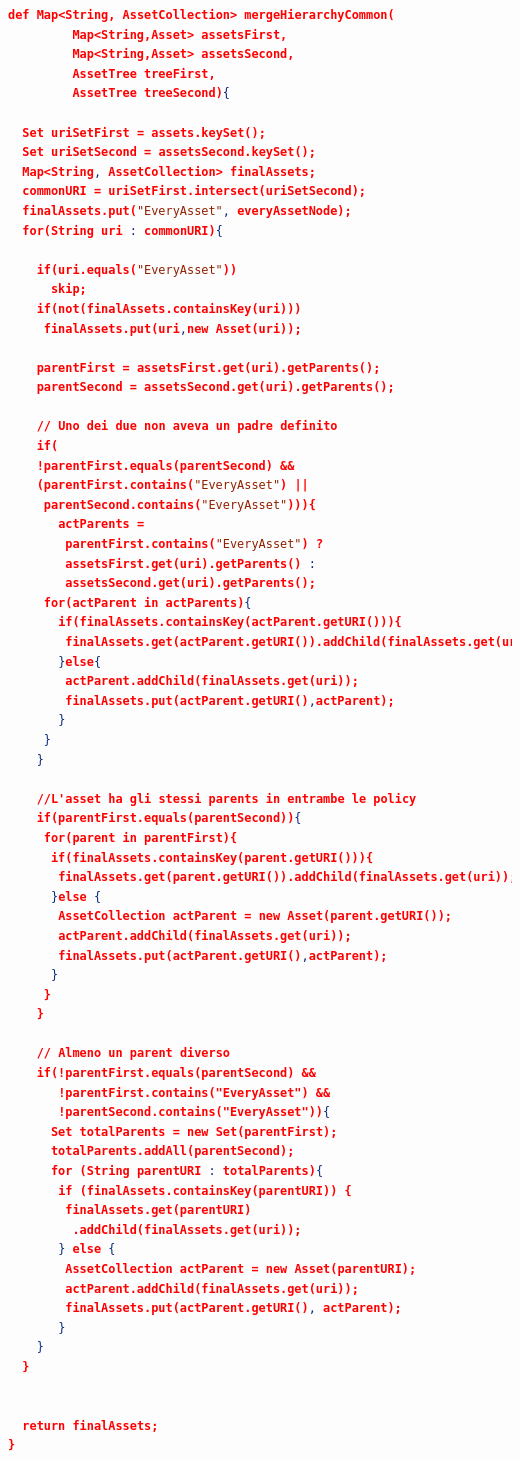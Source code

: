 \documentclass[12pt,a4paper,twoside]{book}
\begin{document}
\begin{lstlisting}[language=Json,firstnumber=1,caption={L'algoritmo ha prestazioni lineari in proporzione al più più grande degli insiemi di asset},label=algoRecoverHierarchyComm,captionpos=b]
def Map<String, AssetCollection> mergeHierarchyCommon(
         Map<String,Asset> assetsFirst,
         Map<String,Asset> assetsSecond,
         AssetTree treeFirst,
         AssetTree treeSecond){
         
  Set uriSetFirst = assets.keySet();
  Set uriSetSecond = assetsSecond.keySet();
  Map<String, AssetCollection> finalAssets;
  commonURI = uriSetFirst.intersect(uriSetSecond);
  finalAssets.put("EveryAsset", everyAssetNode);
  for(String uri : commonURI){
  
    if(uri.equals("EveryAsset"))
      skip;  
    if(not(finalAssets.containsKey(uri)))
     finalAssets.put(uri,new Asset(uri));

    parentFirst = assetsFirst.get(uri).getParents();
    parentSecond = assetsSecond.get(uri).getParents();
    
    // Uno dei due non aveva un padre definito
    if(
    !parentFirst.equals(parentSecond) && 
    (parentFirst.contains("EveryAsset") ||
     parentSecond.contains("EveryAsset"))){
       actParents =
        parentFirst.contains("EveryAsset") ?
        assetsFirst.get(uri).getParents() :
        assetsSecond.get(uri).getParents();
     for(actParent in actParents){
       if(finalAssets.containsKey(actParent.getURI())){
        finalAssets.get(actParent.getURI()).addChild(finalAssets.get(uri));
       }else{
        actParent.addChild(finalAssets.get(uri));
        finalAssets.put(actParent.getURI(),actParent);
       }
     }
    }
    
    //L'asset ha gli stessi parents in entrambe le policy
    if(parentFirst.equals(parentSecond)){
     for(parent in parentFirst){
      if(finalAssets.containsKey(parent.getURI())){
       finalAssets.get(parent.getURI()).addChild(finalAssets.get(uri));
      }else {
       AssetCollection actParent = new Asset(parent.getURI());
       actParent.addChild(finalAssets.get(uri));
       finalAssets.put(actParent.getURI(),actParent);
      }
     }
    }
    
    // Almeno un parent diverso
    if(!parentFirst.equals(parentSecond) &&
       !parentFirst.contains("EveryAsset") && 
       !parentSecond.contains("EveryAsset")){
      Set totalParents = new Set(parentFirst);
      totalParents.addAll(parentSecond);
      for (String parentURI : totalParents){
       if (finalAssets.containsKey(parentURI)) {
        finalAssets.get(parentURI)
         .addChild(finalAssets.get(uri));
       } else {
        AssetCollection actParent = new Asset(parentURI);
        actParent.addChild(finalAssets.get(uri));
        finalAssets.put(actParent.getURI(), actParent);
       }
    }
  }

    
  return finalAssets;
}





  
\end{lstlisting}
\end{document}
